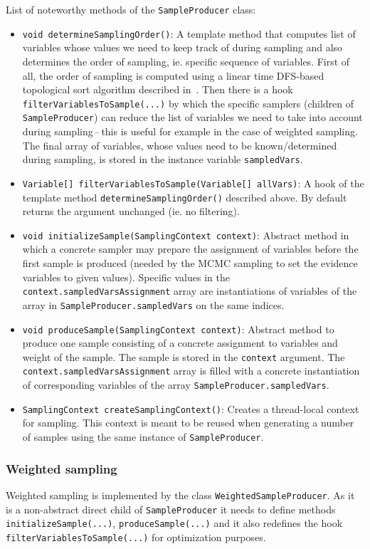 \documentclass[english,cover]{fitthesis} %
\newcommand{\srccode}[1]{{\tt #1}}         %
\begin{document}
\clearpage
List of noteworthy methods of the \srccode{SampleProducer} class:
\begin{itemize}
	\item \srccode{void determineSamplingOrder()}: A template method that computes list of variables whose values we need to keep track of during sampling and also determines the order of sampling, ie. specific sequence of variables. First of all, the order of sampling is computed using a linear time DFS-based topological sort algorithm described in~\cite{cormen_introduction_to_algorithms}. Then there is a hook \srccode{filterVariablesToSample(...)} by which the specific samplers (children of \srccode{SampleProducer}) can reduce the list of variables we need to take into account during sampling\,--\,this is useful for example in the case of weighted sampling. The final array of variables, whose values need to be known/determined during sampling, is stored in the instance variable \srccode{sampledVars}.
	\item \srccode{Variable[] filterVariablesToSample(Variable[] allVars)}: A hook of the template method \srccode{determineSamplingOrder()} described above. By default returns the argument unchanged (ie. no filtering).
	\item \srccode{void initializeSample(SamplingContext context)}: Abstract method in which a concrete sampler may prepare the assignment of variables before the first sample is produced (needed by the MCMC sampling to set the evidence variables to given values). Specific values in the \srccode{context.sampledVarsAssignment} array are instantiations of variables of the array in \srccode{SampleProducer.sampledVars} on the same indices.
	\item \srccode{void produceSample(SamplingContext context)}: Abstract method to produce one sample consisting of a concrete assignment to variables and weight of the sample. The sample is stored in the \srccode{context} argument. The \srccode{context.sampledVarsAssignment} array is filled with a concrete instantiation of corresponding variables of the array \srccode{SampleProducer.sampledVars}.
	\item \srccode{SamplingContext createSamplingContext()}: Creates a thread-local context for sampling. This context is meant to be reused when generating a number of samples using the same instance of \srccode{SampleProducer}.
\end{itemize}


\subsubsection{Weighted sampling}
Weighted sampling is implemented by the class \srccode{WeightedSampleProducer}. As it is a non-abstract direct child of \srccode{SampleProducer} it needs to define methods \srccode{initializeSample(...)}, \srccode{produceSample(...)} and it also redefines the hook \srccode{filterVariablesToSample(...)} for optimization purposes.
\end{document}
